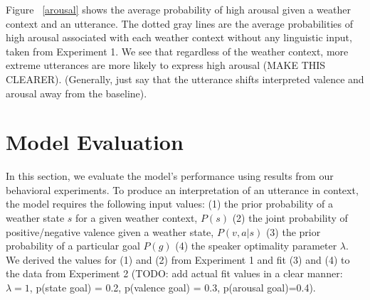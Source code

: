 \documentclass[10pt,letterpaper]{article}
\begin{document}
Figure ~\ref{arousal} shows the average probability of high arousal given a weather context and an utterance. The dotted gray lines are the average probabilities of high arousal associated with each weather context without any linguistic input, taken from Experiment 1. We see that regardless of the weather context, more extreme utterances are more likely to express high arousal (MAKE THIS CLEARER). (Generally, just say that the utterance shifts interpreted valence and arousal away from the baseline). 


\section{Model Evaluation}
In this section, we evaluate the model's performance using results from our behavioral experiments. To produce an interpretation of an utterance in context, the model requires the following input values: (1) the prior probability of a weather state $s$ for a given weather context, $P(s)$ (2) the joint probability of positive/negative valence given a weather state, $P(v, a | s)$ (3) the prior probability of a particular goal $P(g)$ (4) the speaker optimality parameter $\lambda$. We derived the values for (1) and (2) from Experiment 1 and fit (3) and (4) to the data from Experiment 2 (TODO: add actual fit values in a clear manner: $\lambda=1$, p(state goal) = 0.2, p(valence goal) = 0.3, p(arousal goal)=0.4).
\end{document}
